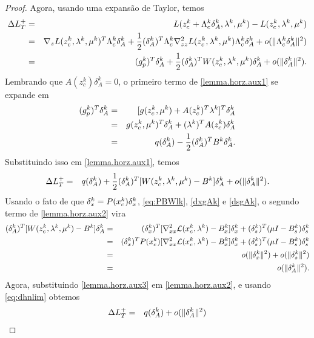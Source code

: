 \begin{proof}
Agora, usando uma expansão de Taylor, temos
\begin{eqnarray}
 \DLH{+} & = & L(\zc{k}+\Lac{k}\delta_A^k,\lk{k},\muc{k}) -
  L(\zc{k},\lk{k},\muc{k}) \nonumber \\
 & = & \nabla_z L(\zc{k},\lk{k},\muc{k})^T\Lac{k}\delta_A^k + \meio
  (\delta_A^k)^T \Lac{k}\nabla_{zz}^2 L(\zc{k},\lk{k},\muc{k})\Lac{k}\delta_A^k
  + o(\norma{\Lac{k}\delta_A^k}^2) \nonumber \\
 & = & (\gpk{k})^T\delta_A^k + \meio (\delta_A^k)^T
  W(\zc{k},\lk{k},\muc{k})\delta_A^k + o(\norma{\delta_A^k}^2).
  \visiblelbl{lemma.horz.aux1}
\end{eqnarray}
Lembrando que $A(z_c^k)\delta_A^k=0$, o primeiro termo de
\eqref{lemma.horz.aux1} se expande em
\begin{eqnarray}
  (g_p^k)^T\delta_A^k & = & [g(z_c^k,\mu^k) + A(z_c^k)^T\lambda^k]^T
  \delta_A^k \nonumber \\
  & = & g(z_c^k,\mu^k)^T\delta_A^k + (\lambda^k)^TA(z_c^k)\delta_A^k \nonumber
  \\
  & = & q(\delta_A^k) - \frac{1}{2} (\delta_A^k)^TB^k\delta_A^k. 
  \nonumber
\end{eqnarray}
Substituindo isso em \eqref{lemma.horz.aux1}, temos
\begin{eqnarray}
\DLH{+} 
& = & q(\delta_A^k) + \meio (\delta_A^k)^T[W(\zc{k}, \lk{k}, \muc{k}) -
  B^k]\delta_A^k + o(\norma{\delta_A^k}^2).
  \visiblelbl{lemma.horz.aux2}
\end{eqnarray}
Usando o fato de que $\delta_x^k = P(x_c^{k})\delta_x^k$, \eqref{eq:PBWlk},
\eqref{dxgAk} e \eqref{dsgAk}, o segundo termo de \eqref{lemma.horz.aux2} vira
\begin{eqnarray}
  (\delta_A^k)^T [W(z_c^k,\lambda^k,\mu^k) - B^k] \delta_A^k 
  & = & (\delta_x^k)^T [\nabla_{xx}^2\mathcal{L}(x_c^k,\lambda^k) - B_x^k]
    \delta_x^k + (\delta_s^k)^T (\mu I - B_s^k) \delta_s^k \nonumber \\
  & = & (\delta_x^k)^TP(x_c^k) [\nabla_{xx}^2 \mathcal{L}(x_c^k,\lambda^k) -
  B_x^k] \delta_x^k + (\delta_s^k)^T(\mu I - B_s^k) \delta_s^k \nonumber \\
  & = & o(\norma{\delta_x^k}^2) + o(\norma{\delta_s^k}^2) \nonumber \\
  & = & o(\norma{\delta_A^k}^2).
  \visiblelbl{lemma.horz.aux3}
\end{eqnarray}
Agora, substituindo \eqref{lemma.horz.aux3} em \eqref{lemma.horz.aux2}, e usando
\eqref{eq:dhnlim} obtemos
\begin{eqnarray}
\DLH{+} 
& = & q(\delta_A^k) + o(\norma{\delta_A^k}^2) \nonumber \\

\end{eqnarray}
\end{proof}
